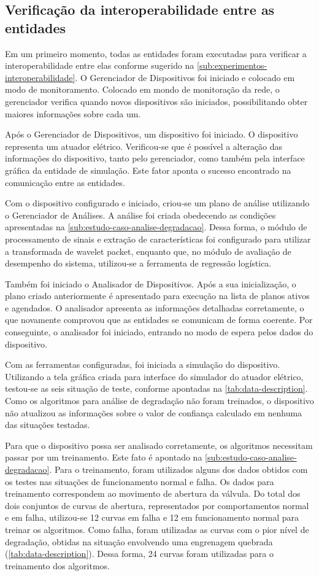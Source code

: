 \subsection{Verificação da interoperabilidade entre as entidades}

Em um primeiro momento, todas as entidades foram executadas para verificar a interoperabilidade
entre elas conforme sugerido na \cref{sub:experimentos-interoperabilidade}. O Gerenciador de
Dispositivos foi iniciado e colocado em modo de monitoramento. Colocado em mondo de monitoração da
rede, o gerenciador verifica quando novos dispositivos são iniciados, possibilitando obter maiores
informações sobre cada um.

Após o Gerenciador de Dispositivos, um dispositivo foi iniciado. O dispositivo representa um atuador
elétrico. Verificou-se que é possível a alteração das informações do dispositivo, tanto pelo
gerenciador, como também pela interface gráfica da entidade de simulação. Este fator aponta o
sucesso encontrado na comunicação entre as entidades.

Com o dispositivo configurado e iniciado, criou-se um plano de análise utilizando o Gerenciador de
Análises. A análise foi criada obedecendo as condições apresentadas na
\cref{sub:estudo-caso-analise-degradacao}. Dessa forma, o módulo de processamento de sinais e
extração de características foi configurado para utilizar a transformada de wavelet packet, enquanto
que, no módulo de avaliação de desempenho do sistema, utilizou-se a ferramenta de regressão
logística.

Também foi iniciado o Analisador de Dispositivos. Após a sua inicialização, o plano criado
anteriormente é apresentado para execução na lista de planos ativos e agendados. O analisador
apresenta as informações detalhadas corretamente, o que novamente comprovou que as entidades se
comunicam de forma coerente. Por conseguinte, o analisador foi iniciado, entrando no modo de espera
pelos dados do dispositivo.

Com as ferramentas configuradas, foi iniciada a simulação do dispositivo. Utilizando a tela gráfica
criada para interface do simulador do atuador elétrico, testou-se as seis situação de teste,
conforme apontadas na \cref{tab:data-description}. Como os algoritmos para análise de degradação não
foram treinados, o dispositivo não atualizou as informações sobre o valor de confiança calculado em
nenhuma das situações testadas.

Para que o dispositivo possa ser analisado corretamente, os algoritmos necessitam passar por um
treinamento. Este fato é apontado na \cref{sub:estudo-caso-analise-degradacao}. Para o treinamento,
foram utilizados alguns dos dados obtidos com os testes nas situações de funcionamento normal e
falha. Os dados para treinamento correspondem ao movimento de abertura da válvula. Do total dos dois
conjuntos de curvas de abertura, representados por comportamentos normal e em falha, utilizou-se
\num{12} curvas em falha e \num{12} em funcionamento normal para treinar os algoritmos. Como falha,
foram utilizadas as curvas com o pior nível de degradação, obtidas na situação envolvendo uma
engrenagem quebrada (\cref{tab:data-description}). Dessa forma, \num{24} curvas foram utilizadas
para o treinamento dos algoritmos.

